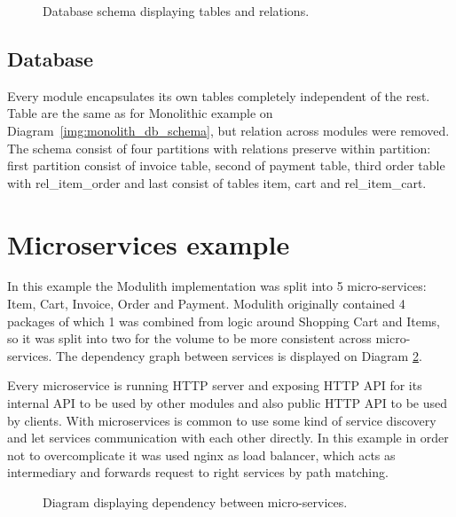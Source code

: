 \begin{figure}
    \centering
    
    \caption{Database schema displaying tables and relations. \label{img:modulith_package}}
\end{figure}

\subsection{Database}
Every module encapsulates its own tables completely independent of the rest. Table are the same as for Monolithic example on Diagram~\ref{img:monolith_db_schema}, but relation across modules were removed. The schema consist of four partitions with relations preserve within partition: first partition consist of invoice table, second of payment table, third order table with rel\_item\_order and last consist of tables item, cart and rel\_item\_cart.


\section{Microservices example}
In this example the Modulith implementation was split into 5 micro-services: Item, Cart, Invoice, Order and Payment. Modulith originally contained 4 packages of which 1 was combined from logic around Shopping Cart and Items, so it was split into two for the volume to be more consistent across micro-services. The dependency graph between services is displayed on Diagram \ref{img:microservices_dependency}.

Every microservice is running HTTP server and exposing HTTP API for its internal API to be used by other modules and also public HTTP API to be used by clients. With microservices is common to use some kind of service discovery and let services communication with each other directly. In this example in order not to overcomplicate it was used nginx as load balancer, which acts as intermediary and forwards request to right services by path matching.

\begin{figure}
    \centering
    
    \caption{Diagram displaying dependency between micro-services. \label{img:microservices_dependency}}
\end{figure}

